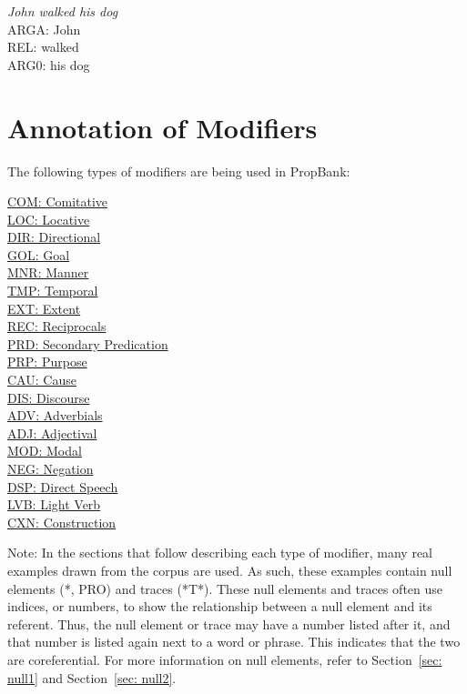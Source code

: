 \documentclass[11pt]{report}
\begin{document}
\textit{John walked his dog}\\
ARGA: John\\
REL: walked\\
ARG0: his dog

\section{Annotation of Modifiers}
The following types of modifiers are being used in PropBank:

\hyperref[ssec: COM]{COM: Comitative} \\
\hyperref[ssec: LOC]{LOC: Locative} \\
\hyperref[ssec: DIR]{DIR: Directional} \\
\hyperref[ssec: GOL]{GOL: Goal} \\
\hyperref[ssec: MNR]{MNR: 	Manner} \\
\hyperref[ssec: TMP]{TMP: Temporal} \\
\hyperref[ssec: EXT]{EXT:	Extent} \\
\hyperref[ssec: REC]{REC:	Reciprocals} \\
\hyperref[ssec: PRD]{PRD: 	Secondary Predication} \\
\hyperref[ssec: PRP]{PRP:	Purpose} \\
\hyperref[ssec: CAU]{CAU: 	Cause} \\
\hyperref[ssec: DIS]{DIS:	Discourse} \\
\hyperref[ssec: ADV]{ADV:	 Adverbials} \\
\hyperref[ssec: ADJ]{ADJ: Adjectival} \\
\hyperref[ssec: MOD]{MOD:	Modal} \\
\hyperref[ssec: NEG]{NEG:	Negation} \\
\hyperref[ssec: DSP]{DSP:    Direct Speech} \\
\hyperref[ssec: LVB]{LVB: Light Verb} \\
\hyperref[ssec: CXN]{CXN: Construction}

Note: In the sections that follow describing each type of modifier, many real examples drawn from the corpus are used.  As such, these examples contain null elements (*, PRO) and traces (*T*).  These null elements and traces often use indices, or numbers, to show the relationship between a null element and its referent.  Thus, the null element or trace may have a number listed after it, and that number is listed again next to a word or phrase.  This indicates that the two are coreferential. For more information on null elements, refer to Section~\ref{sec: null1} and Section~\ref{sec: null2}.
\end{document}
